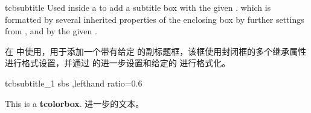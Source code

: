 \begin{docCommand}[doc new=2014-10-10]{tcbsubtitle}{}
Used inside a  to add a subtitle box with the given .
which is formatted by several inherited properties of the enclosing box
by further settings from , and by the given .

在  中使用，用于添加一个带有给定  的副标题框，该框使用封闭框的多个继承属性进行格式设置，并通过  的进一步设置和给定的  进行格式化。

\begin{exdispExample*}{tcbsubtitle_1}{%
sbs%
,lefthand ratio=0.6%
}
\begin{tcolorbox}[title=我的标题,
colback=red!5!white,
colframe=red!75!black,
fonttitle=\bfseries]
  This is a \textbf{tcolorbox}.
进一步的文本。
\end{tcolorbox}
\end{exdispExample*}









\end{docCommand}

